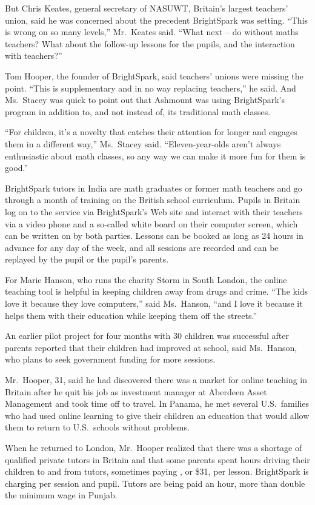 ﻿\documentclass[12pt]{article}
\begin{document}
But Chris Keates, general secretary of NASUWT, Britain's largest teachers' union, said he was
concerned about the precedent BrightSpark was setting. ``This is wrong on so many levels,''
Mr.~Keates said. ``What next -- do without maths teachers? What about the follow-up lessons for the
pupils, and the interaction with teachers?''

Tom Hooper, the founder of BrightSpark, said teachers' unions were missing the point. ``This is
supplementary and in no way replacing teachers,'' he said. And Ms.~Stacey was quick to point out
that Ashmount was using BrightSpark's program in addition to, and not instead of, its traditional
math classes.

``For children, it's a novelty that catches their attention for longer and engages them in a
different way,'' Ms.~Stacey said. ``Eleven-year-olds aren't always enthusiastic about math classes,
so any way we can make it more fun for them is good.''

BrightSpark tutors in India are math graduates or former math teachers and go through a month of
training on the British school curriculum. Pupils in Britain log on to the service via BrightSpark's
Web site and interact with their teachers via a video phone and a so-called white board on their
computer screen, which can be written on by both parties. Lessons can be booked as long as 24 hours
in advance for any day of the week, and all sessions are recorded and can be replayed by the pupil
or the pupil's parents.

For Marie Hanson, who runs the charity Storm in South London, the online teaching tool is helpful in
keeping children away from drugs and crime. ``The kids love it because they love computers,'' said
Ms.~Hanson, ``and I love it because it helps them with their education while keeping them off the
streets.''

An earlier pilot project for four months with 30 children was successful after parents reported that
their children had improved at school, said Ms.~Hanson, who plans to seek government funding for
more sessions.

Mr.~Hooper, 31, said he had discovered there was a market for online teaching in Britain after he
quit his job as investment manager at Aberdeen Asset Management and took time off to travel. In
Panama, he met several U.S.~families who had used online learning to give their children an
education that would allow them to return to U.S.~schools without problems.

When he returned to London, Mr.~Hooper realized that there was a shortage of qualified private
tutors in Britain and that some parents spent hours driving their children to and from tutors,
sometimes paying , or \$31, per lesson. BrightSpark is charging  per
session and pupil. Tutors are being paid  an hour, more than double the minimum wage
in Punjab.
\end{document}
